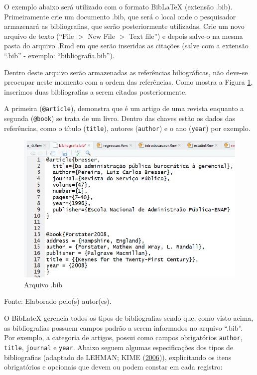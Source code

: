 \documentclass[12pt,brazil,]{book}
\begin{document}
O exemplo abaixo será utilizado com o formato BibLaTeX (extensão .bib).
Primeiramente crie um documento .bib, que será o local onde o
pesquisador armazenará as bibliografias, que serão posteriormente
utilizadas. Crie um novo arquivo de texto (``File \(>\) New File \(>\)
Text file'') e depois salve-o na mesma pasta do arquivo .Rmd em que
serão inseridas as citações (salve com a extensão ``.bib'' - exemplo:
``bibliografia.bib'').

Dentro deste arquivo serão armazenadas as referências biliográficas, não
deve-se preocupar neste momento com a ordem das referências. Como mostra
a Figura \ref{fig:rmarkbib}, inserimos duas bibliografias a serem
citadas posteriormente.

A primeira (\texttt{@article}), demonstra que é um artigo de uma revista
enquanto a segunda (\texttt{@book}) se trata de um livro. Dentro das
chaves estão os dados das referências, como o título (\texttt{title}),
autores (\texttt{author}) e o ano (\texttt{year}) por exemplo.

\begin{figure}

{\centering \includegraphics[width=0.6\linewidth]{rmarkbib} 

}

\caption{Arquivo .bib}\label{fig:rmarkbib}
\end{figure}

Fonte: Elaborado pelo(s) autor(es).

O BibLateX gerencia todos os tipos de bibliografias sendo que, como
visto acima, as bibliografias possuem campos padrão a serem informados
no arquivo ``.bib''. Por exemplo, a categoria de artigos, possui como
campos obrigatórios \texttt{author}, \texttt{title}, \texttt{journal} e
\texttt{year}. Abaixo seguem algumas especificações dos tipos de
bibliografias (adaptado de LEHMAN; KIME
(\protect\hyperlink{ref-biblatex}{2006})), explicitando os itens
obrigatórios e opcionais que devem ou podem constar em cada registro:
\end{document}
